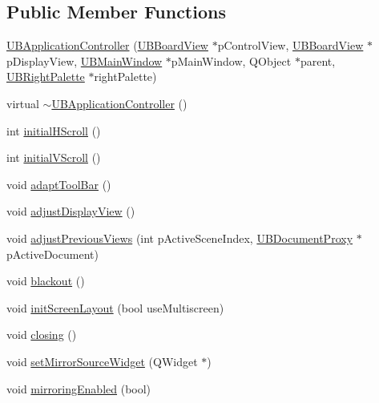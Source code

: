 \subsection*{Public Member Functions}
\begin{DoxyCompactItemize}
\item 
\hyperlink{class_u_b_application_controller_a9b13846d29481cee9b89b5177ff2b3f4}{U\-B\-Application\-Controller} (\hyperlink{class_u_b_board_view}{U\-B\-Board\-View} $\ast$p\-Control\-View, \hyperlink{class_u_b_board_view}{U\-B\-Board\-View} $\ast$p\-Display\-View, \hyperlink{class_u_b_main_window}{U\-B\-Main\-Window} $\ast$p\-Main\-Window, Q\-Object $\ast$parent, \hyperlink{class_u_b_right_palette}{U\-B\-Right\-Palette} $\ast$right\-Palette)
\item 
virtual \hyperlink{class_u_b_application_controller_ae1f9ad331832570c82c3a9033157e642}{$\sim$\-U\-B\-Application\-Controller} ()
\item 
int \hyperlink{class_u_b_application_controller_ae15e6882c28e8133e3af7c5bcadcb240}{initial\-H\-Scroll} ()
\item 
int \hyperlink{class_u_b_application_controller_a1e1c7ac596515159e174013e702f0c80}{initial\-V\-Scroll} ()
\item 
void \hyperlink{class_u_b_application_controller_a2cfda1a9a1e59847502b2c4daac4583f}{adapt\-Tool\-Bar} ()
\item 
void \hyperlink{class_u_b_application_controller_a4cdde5cc4906f7f7ccdbe1a78ac98f3c}{adjust\-Display\-View} ()
\item 
void \hyperlink{class_u_b_application_controller_a20355b74726dce5a3fb46c886c62dcba}{adjust\-Previous\-Views} (int p\-Active\-Scene\-Index, \hyperlink{class_u_b_document_proxy}{U\-B\-Document\-Proxy} $\ast$p\-Active\-Document)
\item 
void \hyperlink{class_u_b_application_controller_aaafa825c25da0324cf8323307fd61ed3}{blackout} ()
\item 
void \hyperlink{class_u_b_application_controller_ad4515cc1199971e7fba2b5afca906781}{init\-Screen\-Layout} (bool use\-Multiscreen)
\item 
void \hyperlink{class_u_b_application_controller_a13ca4ebb295f8dd80390ab49c96ff7c3}{closing} ()
\item 
void \hyperlink{class_u_b_application_controller_afa4aa8833852d7c01d1fc46a9f4dacb3}{set\-Mirror\-Source\-Widget} (Q\-Widget $\ast$)
\item 
void \hyperlink{class_u_b_application_controller_a9a02203ee57211f01b98984dc88029f2}{mirroring\-Enabled} (bool)

\end{DoxyCompactItemize}
